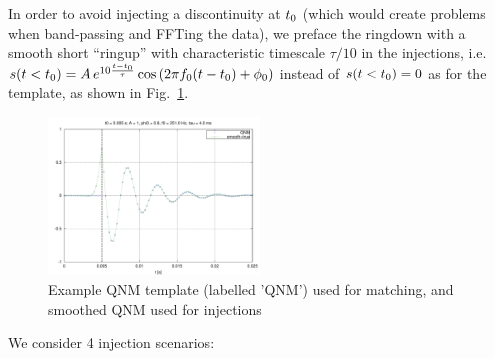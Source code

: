 \documentclass[aps,prd,onecolumn,notitlepage,nofootinbib,superscriptaddress,altaffilletter,floatfix]{revtex4-1}
\begin{document}
In order to avoid injecting a discontinuity at $t_0$ (which would create problems when band-passing and FFTing the data), we preface the ringdown
with a smooth short ``ringup'' with characteristic timescale $\tau/10$ in the injections, i.e.\
$s(t<t_0) = A\,e^{10\frac{t-t_0}{\tau}}\cos\left(2\pi f_0 (t-t_0) + \phi_0\right)$ instead of $s(t<t_0)=0$ as for the template, as
shown in Fig.~\ref{fig:QNMtemplate}.
\begin{figure}[htbp]
  \centering
  \includegraphics[width=0.5\textwidth]{QNMtemplate.pdf}
  \caption{Example QNM template (labelled 'QNM') used for matching, and smoothed QNM used for injections}
  \label{fig:QNMtemplate}
\end{figure}
We consider 4 injection scenarios:
\end{document}
